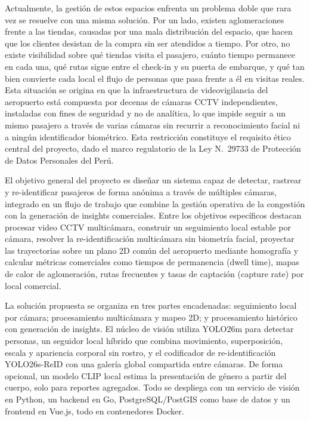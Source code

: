 \documentclass[12pt,letterpaper]{article}
\begin{document}
Actualmente, la gestión de estos espacios enfrenta un problema doble que
rara vez se resuelve con una misma solución. Por un lado, existen
aglomeraciones frente a las tiendas, causadas por una mala distribución
del espacio, que hacen que los clientes desistan de la compra sin ser
atendidos a tiempo. Por otro, no existe visibilidad sobre qué tiendas
visita el pasajero, cuánto tiempo permanece en cada una, qué rutas sigue
entre el check-in y su puerta de embarque, y qué tan bien convierte cada
local el flujo de personas que pasa frente a él en visitas reales. Esta
situación se origina en que la infraestructura de videovigilancia del
aeropuerto está compuesta por decenas de cámaras CCTV independientes,
instaladas con fines de seguridad y no de analítica, lo que impide seguir
a un mismo pasajero a través de varias cámaras sin recurrir a
reconocimiento facial ni a ningún identificador biométrico. Esta
restricción constituye el requisito ético central del proyecto, dado el
marco regulatorio de la Ley N.\textdegree~29733 de Protección de Datos
Personales del Perú.

El objetivo general del proyecto es diseñar un sistema capaz de detectar,
rastrear y re-identificar pasajeros de forma anónima a través de
múltiples cámaras, integrado en un flujo de trabajo que combine la
gestión operativa de la congestión con la generación de insights
comerciales. Entre los objetivos específicos destacan procesar video CCTV
multicámara, construir un seguimiento local estable por cámara, resolver
la re-identificación multicámara sin biometría facial, proyectar las
trayectorias sobre un plano 2D común del aeropuerto mediante homografía y
calcular métricas comerciales como tiempos de permanencia (dwell time),
mapas de calor de aglomeración, rutas frecuentes y tasas de captación
(capture rate) por local comercial.

La solución propuesta se organiza en tres partes encadenadas: seguimiento
local por cámara; procesamiento multicámara y mapeo 2D; y procesamiento
histórico con generación de insights. El núcleo de visión utiliza
YOLO26m para detectar personas, un seguidor local híbrido que combina
movimiento, superposición, escala y apariencia corporal sin rostro, y el
codificador de re-identificación YOLO26s-ReID con una galería global
compartida entre cámaras. De forma opcional, un modelo CLIP local estima
la presentación de género a partir del cuerpo, solo para reportes
agregados. Todo se despliega con un servicio de visión en Python, un
backend en Go, PostgreSQL/PostGIS como base de datos y un frontend en
Vue.js, todo en contenedores Docker.
\end{document}
